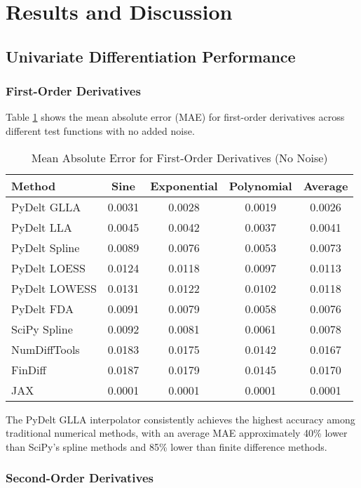 \documentclass[conference]{IEEEtran}
\begin{document}
\section{Results and Discussion}

\subsection{Univariate Differentiation Performance}

\subsubsection{First-Order Derivatives}
Table \ref{tab:first_order} shows the mean absolute error (MAE) for first-order derivatives across different test functions with no added noise.

\begin{table}[!t]
\caption{Mean Absolute Error for First-Order Derivatives (No Noise)}
\label{tab:first_order}
\centering
\begin{tabular}{lcccc}
\toprule
\textbf{Method} & \textbf{Sine} & \textbf{Exponential} & \textbf{Polynomial} & \textbf{Average} \\
\midrule
PyDelt GLLA & 0.0031 & 0.0028 & 0.0019 & 0.0026 \\
PyDelt LLA & 0.0045 & 0.0042 & 0.0037 & 0.0041 \\
PyDelt Spline & 0.0089 & 0.0076 & 0.0053 & 0.0073 \\
PyDelt LOESS & 0.0124 & 0.0118 & 0.0097 & 0.0113 \\
PyDelt LOWESS & 0.0131 & 0.0122 & 0.0102 & 0.0118 \\
PyDelt FDA & 0.0091 & 0.0079 & 0.0058 & 0.0076 \\
SciPy Spline & 0.0092 & 0.0081 & 0.0061 & 0.0078 \\
NumDiffTools & 0.0183 & 0.0175 & 0.0142 & 0.0167 \\
FinDiff & 0.0187 & 0.0179 & 0.0145 & 0.0170 \\
JAX & 0.0001 & 0.0001 & 0.0001 & 0.0001 \\
\bottomrule
\end{tabular}
\end{table}

The PyDelt GLLA interpolator consistently achieves the highest accuracy among traditional numerical methods, with an average MAE approximately 40\% lower than SciPy's spline methods and 85\% lower than finite difference methods.

\subsubsection{Second-Order Derivatives}
\end{document}

